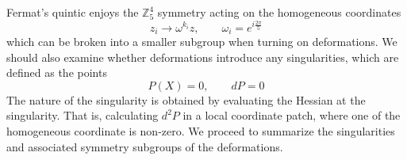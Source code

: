 Fermat's quintic enjoys the $\mathbb Z_5^4$ symmetry acting on the homogeneous coordinates 
\begin{equation}
  z_i \to \omega^{k_i} z, \qquad \omega_i=e^{i\frac{2\pi}{5}}
  \label{eq:sim}
\end{equation}
which can be broken into a smaller subgroup when turning on deformations.
We should also examine whether deformations introduce any singularities, which
are defined as the points 
\begin{equation}
  P(X)=0, \qquad dP=0
\end{equation}
The nature of the singularity is obtained by evaluating the Hessian at the singularity.
That is, calculating $d^2 P$ in a local coordinate patch, where one of the homogeneous coordinate is non-zero.
We proceed to summarize the singularities and associated symmetry subgroups of the deformations.

